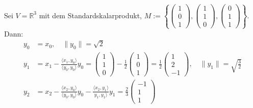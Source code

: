 \documentclass[parskip,a4paper,twoside,DIV15,BCOR12mm]{scrbook}
\begin{document}
\begin{example}
Sei \(V=\mathbb{R}^{3}\) mit dem Standardskalarprodukt, 
\(M:=\left\{
\begin{pmatrix}1\\0\\1\end{pmatrix},
\begin{pmatrix}1\\1\\0\end{pmatrix},
\begin{pmatrix}0\\1\\1\end{pmatrix}
\right\}\).
Dann:
\begin{align*}
y_{0}&=x_{0},\quad\lVert y_{0}\rVert=\sqrt{2}\\
y_{1}&=x_{1}-\frac{\langle x_{1},y_{0}\rangle}{\langle y_{0},y_{0}\rangle}y_{0}
    =\begin{pmatrix}1\\1\\0\end{pmatrix}-\frac{1}{2}\begin{pmatrix}1\\0\\1\end{pmatrix}
    =\frac{1}{2}\begin{pmatrix}1\\2\\-1\end{pmatrix},
    \quad\lVert y_{1}\rVert=\sqrt{\frac{3}{2}}\\
y_{2}&=x_{2}-\frac{\langle x_{2},y_{0}\rangle}{\langle y_{0},y_{0}\rangle}y_{0}-
    \frac{\langle x_{2},y_{1}\rangle}{y_{1},y_{1}\rangle}y_{1}
    =\frac{2}{3}\begin{pmatrix}-1\\1\\1\end{pmatrix}
\end{align*}
\end{example}
\end{document}
